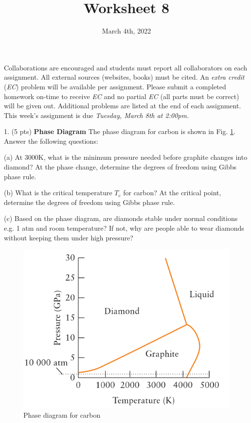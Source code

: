 \documentclass[11pt]{article}
\title{\textbf{Worksheet 8}}
\date{\vspace{-2em}March 4th, 2022}
\begin{document}
\maketitle

Collaborations are encouraged and students must report all collaborators
on each assignment. All external sources (websites, books) must be
cited. An \textit{extra credit} (\textit{EC}) problem will be available per
assignment. Please submit a completed homework on-time to receive \textit{EC}
and no partial \textit{EC} (all parts must be correct) will be given out.
Additional problems are listed at the end of each assignment. This week's
assignment is due \textit{Tuesday, March 8th at 2:00pm.}

1. (5 pts) \textbf{Phase Diagram} The phase diagram for carbon is shown in Fig. \ref{fig:carb}.
Answer the following questions:

(a) At 3000K, what is the minimum pressure needed before graphite changes into
diamond? At the phase change, determine the degrees of freedom using Gibbs phase rule.

(b) What is the critical temperature $T_c$ for carbon? At the critical point,
determine the degrees of freedom using Gibbs phase rule.

(c) Based on the phase diagram, are diamonds stable under normal conditions e.g.
1 atm and room temperature? If not, why are people able to wear diamonds without
keeping them under high pressure?

\begin{figure}[hbpt]
  \centering
  \includegraphics[scale=0.4]{carbon.png}
  \caption{Phase diagram for carbon}
  \label{fig:carb}
\end{figure}
\end{document}
